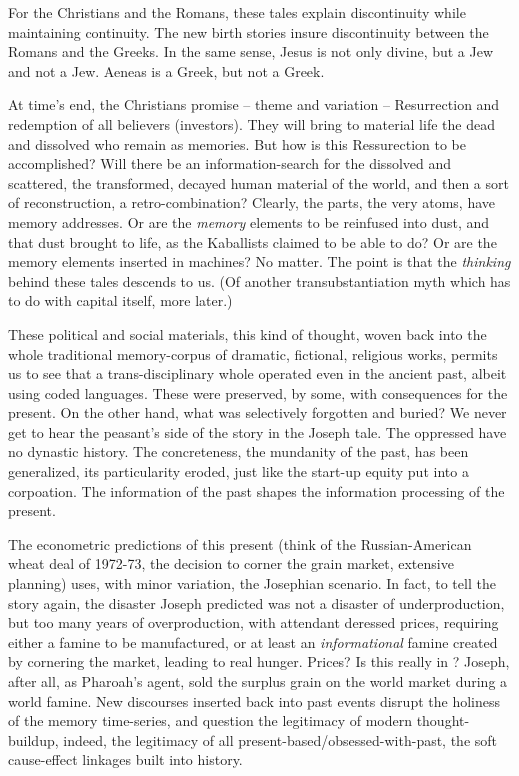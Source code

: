 For the Christians and the Romans, these
tales explain discontinuity while maintaining continuity. The new birth stories insure
discontinuity between the Romans and the
Greeks. In the same sense, Jesus is not only
divine, but a Jew and not a Jew. Aeneas is a
Greek, but not a Greek.

At time's end, the Christians promise -- 
theme and variation -- Resurrection and redemption of all believers (investors). They
will bring to material life the dead and
dissolved who remain as memories. But how
is this Ressurection to be accomplished?
Will there be an information-search for the
dissolved and scattered, the transformed,
decayed human material of the world, and
then a sort of reconstruction, a retro-combination? Clearly, the parts, the very atoms,
have memory addresses. Or are the \emph{memory}
elements to be reinfused into dust, and that
dust brought to life, as the Kaballists claimed
to be able to do? Or are the memory elements
inserted in machines? No matter. The point
is that the \emph{thinking} behind these tales descends to us. (Of another transubstantiation
myth which has to do with capital itself, more later.)

These political and social materials, this
kind of thought, woven back into the whole
traditional memory-corpus of dramatic, fictional, religious works, permits us to see that
a trans-disciplinary
whole operated even
in the ancient past, albeit using coded languages. These were preserved, by some, with
consequences for the present. On the other
hand, what was selectively forgotten and
buried? We never get to hear the peasant's
side of the story in the Joseph tale. The
oppressed have no dynastic history. The
concreteness, the mundanity of the past, has
been generalized, its particularity eroded,
just like the start-up equity put into a corpoation. The information of the past shapes
the information processing of the present.

The econometric predictions of this present (think of the Russian-American wheat
deal of 1972-73, the decision to corner the
grain market, extensive planning) uses, with
minor variation, the Josephian scenario. In
fact, to tell the story again, the disaster
Joseph predicted was not a disaster of underproduction, but too many years of overproduction, with attendant deressed prices, requiring either a famine to be manufactured,
or at least an \emph{informational} famine created
by cornering the market, leading to real
hunger. Prices? Is this really in ?
Joseph, after all, as Pharoah's agent, sold the
surplus grain on the world market during a
world famine. New discourses inserted back
into past events disrupt the holiness of the
memory time-series, and question the legitimacy of modern thought-buildup, indeed,
the legitimacy of all present-based\slash obsessed-with-past, the soft cause-effect linkages built
into history.

